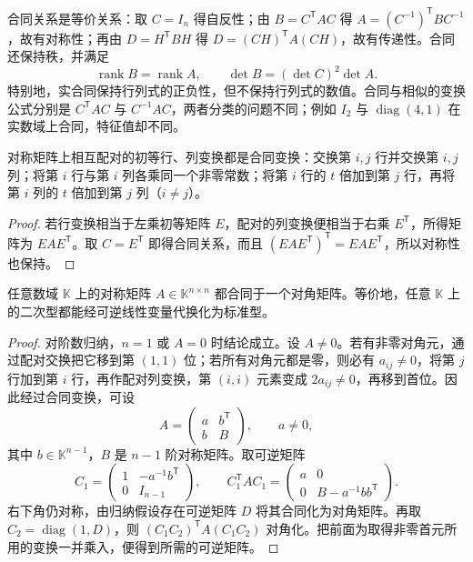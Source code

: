 合同关系是等价关系：取 $C=I_n$ 得自反性；由 $B=C^{\mathsf T}AC$ 得 $A=(C^{-1})^{\mathsf T}BC^{-1}$，故有对称性；再由 $D=H^{\mathsf T}BH$ 得 $D=(CH)^{\mathsf T}A(CH)$，故有传递性。合同还保持秩，并满足
\begin{equation}
\label{eq:congruence-rank-determinant}
    \operatorname{rank}B=\operatorname{rank}A,
    \qquad \det B=(\det C)^2\det A.
\end{equation}
特别地，实合同保持行列式的正负性，但不保持行列式的数值。合同与相似的变换公式分别是 $C^{\mathsf T}AC$ 与 $C^{-1}AC$，两者分类的问题不同；例如 $I_2$ 与 $\operatorname{diag}(4,1)$ 在实数域上合同，特征值却不同。

\begin{lemma}
\label{lem:paired-congruence-operations}
对称矩阵上相互配对的初等行、列变换都是合同变换：交换第 $i,j$ 行并交换第 $i,j$ 列；将第 $i$ 行与第 $i$ 列各乘同一个非零常数；将第 $i$ 行的 $t$ 倍加到第 $j$ 行，再将第 $i$ 列的 $t$ 倍加到第 $j$ 列（$i\ne j$）。
\end{lemma}
\begin{proof}
若行变换相当于左乘初等矩阵 $E$，配对的列变换便相当于右乘 $E^{\mathsf T}$，所得矩阵为 $EAE^{\mathsf T}$。取 $C=E^{\mathsf T}$ 即得合同关系，而且 $(EAE^{\mathsf T})^{\mathsf T}=EAE^{\mathsf T}$，所以对称性也保持。
\end{proof}

\begin{theorem}
\label{thm:symmetric-congruence-diagonalization}
任意数域 $\mathbb K$ 上的对称矩阵 $A\in\mathbb K^{n\times n}$ 都合同于一个对角矩阵。等价地，任意 $\mathbb K$ 上的二次型都能经可逆线性变量代换化为标准型。
\end{theorem}
\begin{proof}
对阶数归纳，$n=1$ 或 $A=0$ 时结论成立。设 $A\ne0$。若有非零对角元，通过配对交换把它移到第 $(1,1)$ 位；若所有对角元都是零，则必有 $a_{ij}\ne0$，将第 $j$ 行加到第 $i$ 行，再作配对列变换，第 $(i,i)$ 元素变成 $2a_{ij}\ne0$，再移到首位。因此经过合同变换，可设
\[
    A=\begin{pmatrix}a&b^{\mathsf T}\\b&B\end{pmatrix},
    \qquad a\ne0,
\]
其中 $b\in\mathbb K^{n-1}$，$B$ 是 $n-1$ 阶对称矩阵。取可逆矩阵
\begin{equation}
\label{eq:quadratic-schur-elimination}
    C_1=\begin{pmatrix}1&-a^{-1}b^{\mathsf T}\\0&I_{n-1}\end{pmatrix},
    \qquad
    C_1^{\mathsf T}AC_1
    =\begin{pmatrix}a&0\\0&B-a^{-1}bb^{\mathsf T}\end{pmatrix}.
\end{equation}
右下角仍对称，由归纳假设存在可逆矩阵 $D$ 将其合同化为对角矩阵。再取 $C_2=\operatorname{diag}(1,D)$，则 $(C_1C_2)^{\mathsf T}A(C_1C_2)$ 对角化。把前面为取得非零首元所用的变换一并乘入，便得到所需的可逆矩阵。
\end{proof}

